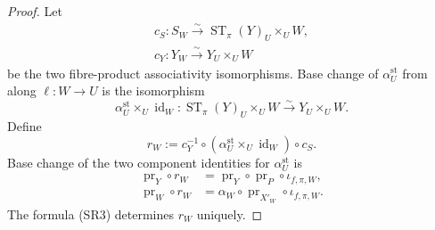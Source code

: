 \begin{proof}
  Let
  \[
  \begin{gathered}
    c_S\colon S_W\xrightarrow{\sim}
      \operatorname{ST}_\pi(Y)_U\times_UW,\\
    c_Y\colon Y_W\xrightarrow{\sim}Y_U\times_UW
  \end{gathered}                                                    \tag{SR2}
  \]
  be the two fibre-product associativity isomorphisms.  Base change of
  $\alpha_U^{\mathrm{st}}$ from
   along
  $\ell\colon W\to U$ is the isomorphism
  \[
    \alpha_U^{\mathrm{st}}\times_U\operatorname{id}_W\colon
      \operatorname{ST}_\pi(Y)_U\times_UW
        \xrightarrow{\sim}Y_U\times_UW.
  \]
  Define
  \[
    r_W:=c_Y^{-1}\circ
      (\alpha_U^{\mathrm{st}}\times_U\operatorname{id}_W)\circ c_S.
                                                                    \tag{SR3}
  \]
  Base change of the two component identities for
  $\alpha_U^{\mathrm{st}}$ is
  \[
  \begin{aligned}
    \operatorname{pr}_Y\circ r_W
      &=\operatorname{pr}_Y\circ\operatorname{pr}_P\circ
        \iota_{f,\pi,W},\\
    \operatorname{pr}_W\circ r_W
      &=\alpha_W\circ\operatorname{pr}_{X'_W}\circ
        \iota_{f,\pi,W}.
  \end{aligned}
  \]
  The formula (SR3) determines $r_W$ uniquely.
\end{proof}

